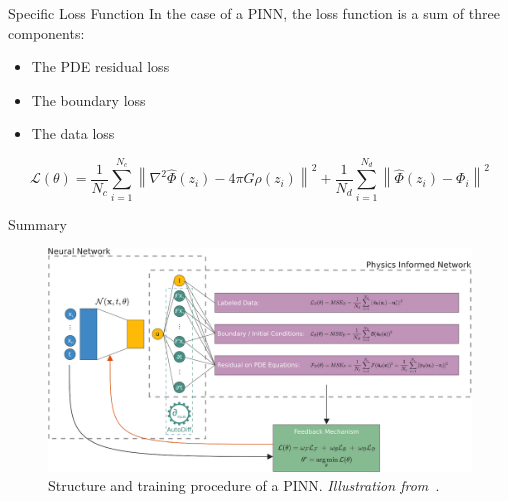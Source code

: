 \begin{frame}{Specific Loss Function}
    In the case of a PINN, the loss function is a sum of three components:

    \begin{itemize}
        \item The PDE residual loss 
        \item The boundary loss
        \item The data loss
    \end{itemize}

    \begin{equation*}
        \label{eq:loss-galaxy}
        \mathcal{L}(\theta) = \dfrac{1}{N_c}\sum^{N_c}_{i=1} \left\|\nabla^2 \hat{\Phi}(z_i) - 4 \pi G \rho(z_i) \right\|^2 + \dfrac{1}{N_{d}}\sum^{N_{d}}_{i=1} \left\|\hat{\Phi}(z_i) - \Phi_i \right\|^2
    \end{equation*}


\end{frame}

\begin{frame}{Summary}
    \begin{figure}[ht]
    \centering
    \includegraphics[scale=0.2]{imgs/training-pinn-schema.png}
    \caption{Structure and training procedure of a PINN. \textit{Illustration from~\cite{cuomo_scientific_2022}}.}
    \label{fig:loss-pinn}
\end{figure}

\end{frame}
